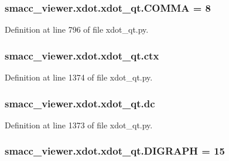 \subsubsection[{\texorpdfstring{C\+O\+M\+MA}{COMMA}}]{ smacc\+\_\+viewer.\+xdot.\+xdot\+\_\+qt.\+C\+O\+M\+MA = 8}\hypertarget{namespacesmacc__viewer_1_1xdot_1_1xdot__qt_a033b147ed345ecb67165adfc27de5b39}{}\label{namespacesmacc__viewer_1_1xdot_1_1xdot__qt_a033b147ed345ecb67165adfc27de5b39}


Definition at line 796 of file xdot\+\_\+qt.\+py.

\subsubsection[{\texorpdfstring{ctx}{ctx}}]{\setlength{\rightskip}{0pt plus 5cm}smacc\+\_\+viewer.\+xdot.\+xdot\+\_\+qt.\+ctx}\hypertarget{namespacesmacc__viewer_1_1xdot_1_1xdot__qt_a9f8d32bd9e568c00c10171dc27e9483a}{}\label{namespacesmacc__viewer_1_1xdot_1_1xdot__qt_a9f8d32bd9e568c00c10171dc27e9483a}


Definition at line 1374 of file xdot\+\_\+qt.\+py.

\subsubsection[{\texorpdfstring{dc}{dc}}]{\setlength{\rightskip}{0pt plus 5cm}smacc\+\_\+viewer.\+xdot.\+xdot\+\_\+qt.\+dc}\hypertarget{namespacesmacc__viewer_1_1xdot_1_1xdot__qt_a426c573b05d891f2649fb83a0a7a850b}{}\label{namespacesmacc__viewer_1_1xdot_1_1xdot__qt_a426c573b05d891f2649fb83a0a7a850b}


Definition at line 1373 of file xdot\+\_\+qt.\+py.

\subsubsection[{\texorpdfstring{D\+I\+G\+R\+A\+PH}{DIGRAPH}}]{ smacc\+\_\+viewer.\+xdot.\+xdot\+\_\+qt.\+D\+I\+G\+R\+A\+PH = 15}\hypertarget{namespacesmacc__viewer_1_1xdot_1_1xdot__qt_a5ced3213c63b1c0deccb1133553959c5}{}\label{namespacesmacc__viewer_1_1xdot_1_1xdot__qt_a5ced3213c63b1c0deccb1133553959c5}



